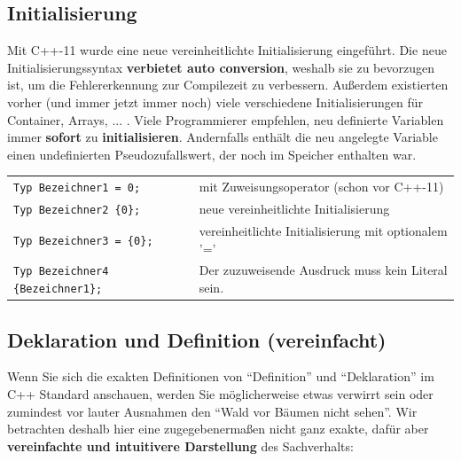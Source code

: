 \documentclass[a4paper]{report}
\begin{document}
\subsection{Initialisierung}
Mit C++-11 wurde eine neue vereinheitlichte Initialisierung eingeführt. Die neue Initialisierungssyntax \textbf{verbietet auto conversion}, weshalb sie zu bevorzugen ist, um die Fehlererkennung zur Compilezeit zu verbessern. Außerdem existierten vorher (und immer jetzt immer noch) viele verschiedene Initialisierungen für Container, Arrays, ... . Viele Programmierer empfehlen, neu definierte Variablen immer \textbf{sofort} zu \textbf{initialisieren}. Andernfalls enthält die neu angelegte Variable einen undefinierten Pseudozufallswert, der noch im Speicher enthalten war.
\begin{center}
\begin{tabular}{|l|l|}
	\hline
	\texttt{Typ Bezeichner1 = 0;} & mit Zuweisungsoperator (schon vor C++-11) \\
	\texttt{Typ Bezeichner2 \textrm{\{}0\textrm{\}};} & neue vereinheitlichte Initialisierung \\
	\texttt{Typ Bezeichner3 = \textrm{\{}0\textrm{\}};} & vereinheitlichte Initialisierung mit optionalem '=' \\
	\texttt{Typ Bezeichner4 \textrm{\{}Bezeichner1\textrm{\}};} & Der zuzuweisende Ausdruck muss kein Literal sein. \\
	\hline
\end{tabular}
\end{center}

\subsection{Deklaration und Definition (vereinfacht)}

Wenn Sie sich die exakten Definitionen von "`Definition"' und "`Deklaration"' im C++ Standard anschauen, werden Sie möglicherweise etwas verwirrt sein oder zumindest vor lauter Ausnahmen den "`Wald vor Bäumen nicht sehen"'. Wir betrachten deshalb hier eine zugegebenermaßen nicht ganz exakte, dafür aber \textbf{vereinfachte und intuitivere Darstellung} des Sachverhalts:
\end{document}
